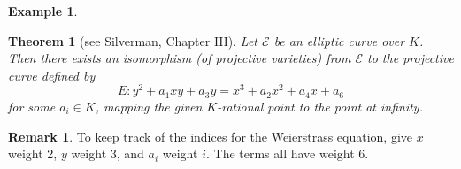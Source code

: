 \documentclass[a4paper]{article}
\newtheorem{theorem}{Theorem}
\theoremstyle{definition}
\newtheorem*{remark}{Remark}
\newtheorem*{example}{Example}
\newcommand{\E}{\mathcal{E}}
\begin{document}
\begin{example}
\begin{figure}[htb]
        \medskip
        \begin{subfigure}{0.25\textwidth}
        \end{subfigure}
        \begin{subfigure}{0.25\textwidth}
        \end{subfigure}
    \end{figure}
\end{example}

\begin{theorem}[see Silverman, Chapter III]
    Let $\E$ be an elliptic curve over $K$. Then there exists an isomorphism (of
    projective varieties) from $\E$ to the projective curve defined by
    \begin{equation*}
        E : y^2 + a_1xy + a_3y = x^3 + a_2x^2 + a_4x + a_6
    \end{equation*}
    for some $a_i\in K$, mapping the given $K$-rational point to the point at
    infinity.
\end{theorem}

\begin{remark}
    To keep track of the indices for the Weierstrass equation, give $x$ weight
    2, $y$ weight 3, and $a_i$ weight $i$. The terms all have weight 6.
\end{remark}
\end{document}
